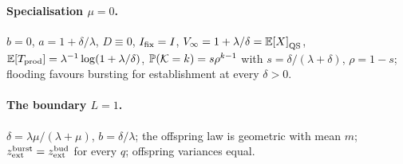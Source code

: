\paragraph{Specialisation $\mu=0$.} $b=0$, $a=1+\delta/\lambda$, $D\equiv0$,
$I_{\mathrm{fix}}=I$, $V_\infty=1+\lambda/\delta=\mathbb{E}\!\left[X\right]_{\rm QS}$,
$\mathbb{E}\!\left[T_{\rm prod}\right]=\lambda^{-1}\log(1+\lambda/\delta)$,
$\mathbb{P}\!\left(\mathcal{K}=k\right)=s\rho^{k-1}$ with $s=\delta/(\lambda+\delta)$, $\rho=1-s$;
flooding favours bursting for establishment at every $\delta>0$.

\paragraph{The boundary $L=1$.} $\delta=\lambda\mu/(\lambda+\mu)$,
$b=\delta/\lambda$; the offspring law is geometric with mean $m$;
$z_{\rm ext}^{\rm burst}=z_{\rm ext}^{\rm bud}$ for every $q$; offspring
variances equal.

\endgroup
\restoretoc
